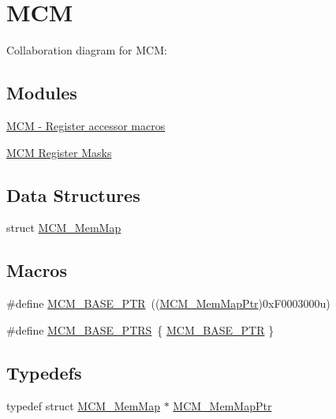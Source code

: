 \hypertarget{group___m_c_m___peripheral}{}\section{M\+CM}
\label{group___m_c_m___peripheral}
Collaboration diagram for M\+CM\+:
\subsection*{Modules}
\begin{DoxyCompactItemize}
\item 
\hyperlink{group___m_c_m___register___accessor___macros}{M\+C\+M -\/ Register accessor macros}
\item 
\hyperlink{group___m_c_m___register___masks}{M\+C\+M Register Masks}
\end{DoxyCompactItemize}
\subsection*{Data Structures}
\begin{DoxyCompactItemize}
\item 
struct \hyperlink{struct_m_c_m___mem_map}{M\+C\+M\+\_\+\+Mem\+Map}
\end{DoxyCompactItemize}
\subsection*{Macros}
\begin{DoxyCompactItemize}
\item 
\#define \hyperlink{group___m_c_m___peripheral_gad41e931f176c230831e3dbad45117841}{M\+C\+M\+\_\+\+B\+A\+S\+E\+\_\+\+P\+TR}~((\hyperlink{group___m_c_m___peripheral_ga72e8bbe428d9410917903164d3a5f675}{M\+C\+M\+\_\+\+Mem\+Map\+Ptr})0x\+F0003000u)
\item 
\#define \hyperlink{group___m_c_m___peripheral_gae2d5e838ce7d2d4108738c05bf224272}{M\+C\+M\+\_\+\+B\+A\+S\+E\+\_\+\+P\+T\+RS}~\{ \hyperlink{group___m_c_m___peripheral_gad41e931f176c230831e3dbad45117841}{M\+C\+M\+\_\+\+B\+A\+S\+E\+\_\+\+P\+TR} \}
\end{DoxyCompactItemize}
\subsection*{Typedefs}
\begin{DoxyCompactItemize}
\item 
typedef struct \hyperlink{struct_m_c_m___mem_map}{M\+C\+M\+\_\+\+Mem\+Map} $\ast$ \hyperlink{group___m_c_m___peripheral_ga72e8bbe428d9410917903164d3a5f675}{M\+C\+M\+\_\+\+Mem\+Map\+Ptr}
\end{DoxyCompactItemize}


